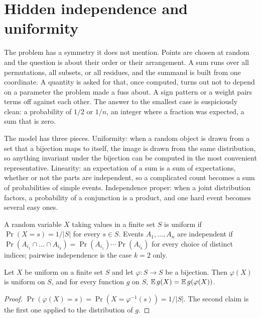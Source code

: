 \section{Hidden independence and uniformity}

\begin{recognise}
The problem has a symmetry it does not mention. Points are chosen at random and the question is about their order or their arrangement. A sum runs over all permutations, all subsets, or all residues, and the summand is built from one coordinate. A quantity is asked for that, once computed, turns out not to depend on a parameter the problem made a fuss about. A sign pattern or a weight pairs terms off against each other. The answer to the smallest case is suspiciously clean: a probability of $1/2$ or $1/n$, an integer where a fraction was expected, a sum that is zero.
\end{recognise}

The model has three pieces. Uniformity: when a random object is drawn from a set that a bijection maps to itself, the image is drawn from the same distribution, so anything invariant under the bijection can be computed in the most convenient representative. Linearity: an expectation of a sum is a sum of expectations, whether or not the parts are independent, so a complicated count becomes a sum of probabilities of simple events. Independence proper: when a joint distribution factors, a probability of a conjunction is a product, and one hard event becomes several easy ones.

\begin{definition}
A random variable $X$ taking values in a finite set $S$ is uniform if $\Pr(X=s)=1/|S|$ for every $s\in S$. Events $A_1,\dots,A_n$ are independent if $\Pr(A_{i_1}\cap\dots\cap A_{i_k})=\Pr(A_{i_1})\cdots\Pr(A_{i_k})$ for every choice of distinct indices; pairwise independence is the case $k=2$ only.
\end{definition}

\begin{lemma}
Let $X$ be uniform on a finite set $S$ and let $\varphi\colon S\to S$ be a bijection. Then $\varphi(X)$ is uniform on $S$, and for every function $g$ on $S$, $\mathbb{E}\, g(X)=\mathbb{E}\, g(\varphi(X))$.
\end{lemma}

\begin{proof}
$\Pr(\varphi(X)=s)=\Pr(X=\varphi^{-1}(s))=1/|S|$. The second claim is the first one applied to the distribution of $g$.
\end{proof}

